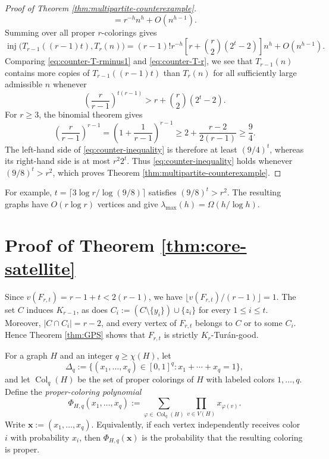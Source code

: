 \documentclass[11pt]{article}
\numberwithin{equation}{section}
\theoremstyle{definition}
\theoremstyle{remark}
\newcommand{\inj}{\operatorname{inj}}
\newcommand{\Col}{\operatorname{Col}}
\begin{document}
\begin{proof}[Proof of Theorem \ref{thm:multipartite-counterexample}]
\[  =r^{-h}n^h+O(n^{h-1}).
\]
Summing over all proper $r$-colorings gives
\begin{equation}
\label{eq:counter-T-r}
  \inj\bigl(T_{r-1}((r-1)t),T_r(n)\bigr)
  =(r-1)!r^{-h}
  \left[r+\binom r2(2^t-2)\right]n^h+O(n^{h-1}).
\end{equation}
Comparing \eqref{eq:counter-T-rminus1} and \eqref{eq:counter-T-r},
we see that $T_{r-1}(n)$ contains more copies of
$T_{r-1}((r-1)t)$ than $T_r(n)$ for all sufficiently large admissible
$n$ whenever
\begin{equation}
\label{eq:counter-inequality}
  \left(\frac r{r-1}\right)^{t(r-1)}
  >r+\binom r2(2^t-2).
\end{equation}
For $r\ge3$, the binomial theorem gives
\[
  \left(\frac r{r-1}\right)^{r-1}
  =\left(1+\frac1{r-1}\right)^{r-1}
  \ge 2+\frac{r-2}{2(r-1)}\ge\frac94.
\]
The left-hand side of \eqref{eq:counter-inequality} is therefore at
least $(9/4)^t$, whereas its right-hand side is at most $r^2 2^t$.
Thus \eqref{eq:counter-inequality} holds whenever
$(9/8)^t>r^2$, which proves Theorem \ref{thm:multipartite-counterexample}.
\end{proof}

For example, $t=\lceil3\log r/\log(9/8)\rceil$ satisfies
$(9/8)^t>r^2$. The resulting graphs have $O(r\log r)$ vertices and give
$\lambda_{\max}(h)=\Omega(h/\log h)$.

\section{Proof of Theorem \ref{thm:core-satellite}}
\label{sec:core-satellite-proof}

Since $v(F_{r,t})=r-1+t<2(r-1)$, we have
$\lfloor v(F_{r,t})/(r-1)\rfloor=1$. The set $C$ induces $K_{r-1}$,
as does $C_i:=(C\setminus\{y_i\})\cup\{z_i\}$ for every
$1\le i\le t$. Moreover, $|C\cap C_i|=r-2$, and every vertex of
$F_{r,t}$ belongs to $C$ or to some $C_i$. Hence Theorem \ref{thm:GPS}
shows that $F_{r,t}$ is strictly $K_r$-Tur\'an-good.

For a graph $H$ and an integer $q\ge\chi(H)$, let
\[
\Delta_q:=\{(x_1,\ldots,x_q)\in[0,1]^q:x_1+\cdots+x_q=1\},
\]
and let $\Col_q(H)$ be the set of proper colorings of $H$ with labeled colors $1,\ldots,q$. Define the \emph{proper-coloring polynomial}
\[
\Phi_{H,q}(x_1,\ldots,x_q)
:=\sum_{\varphi\in\Col_q(H)}\prod_{v\in V(H)}x_{\varphi(v)}.
\]
Write $\boldsymbol{x}:=(x_1,\ldots,x_q)$. Equivalently, if each vertex independently receives color $i$ with probability $x_i$, then $\Phi_{H,q}(\boldsymbol{x})$ is the probability that the resulting coloring is proper.
\end{document}
